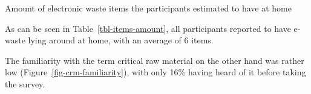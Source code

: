 \documentclass[
  letterpaper,
  DIV=11,
  numbers=noendperiod]{scrartcl}
\begin{document}
\begin{table}

\caption{\label{tbl-items-amount}Amount of electronic waste items the
participants estimated to have at home}


\end{table}%

As can be seen in Table~\ref{tbl-items-amount}, all participants
reported to have e-waste lying around at home, with an average of 6
items.

The familiarity with the term critical raw material on the other hand
was rather low (Figure~\ref{fig-crm-familiarity}), with only 16\% having
heard of it before taking the survey.
\end{document}
